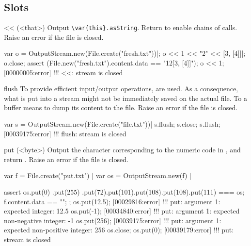 \subsection{Slots}

\begin{urbiscriptapi}
\item[<<](<that>)%
  Output \lstinline|\var{this}.asString|.  Return \this to
  enable chains of calls.  Raise an error if the file is closed.
\begin{urbiscript}
var o = OutputStream.new(File.create("fresh.txt"))|;
o << 1 << "2" << [3, [4]]|;
o.close;
assert (File.new("fresh.txt").content.data == "12[3, [4]]");
o << 1;
[00000005:error] !!! <<: stream is closed
\end{urbiscript}

\item[flush]%
  To provide efficient input/output operations,  are
  used.  As a consequence, what is put into a stream might not be
  immediately saved on the actual file.  To  a buffer means to
  dump its content to the file.  Raise an error if the file is closed.
\begin{urbiscript}
var s = OutputStream.new(File.create("file.txt"))|
s.flush;
s.close;
s.flush;
[00039175:error] !!! flush: stream is closed
\end{urbiscript}

\item[put](<byte>)%
  Output the character corresponding to the numeric code  in
  \this, and return \this.  Raise an error if the file is closed.
\begin{urbiscript}
var f = File.create("put.txt") |
var os = OutputStream.new(f) |

assert
{
  os.put(0)
    .put(255)
    .put(72).put(101).put(108).put(108).put(111)
  === os;
  f.content.data == "\0\xffHello";
};
os.put(12.5);
[00029816:error] !!! put: argument 1: expected integer: 12.5
os.put(-1);
[00034840:error] !!! put: argument 1: expected non-negative integer: -1
os.put(256);
[00039175:error] !!! put: argument 1: expected non-positive integer: 256
os.close;
os.put(0);
[00039179:error] !!! put: stream is closed
\end{urbiscript}

\end{urbiscriptapi}


